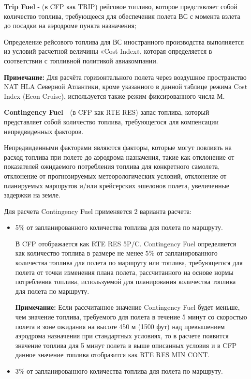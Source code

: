 \textbf{Trip Fuel} - (в CFP как TRIP) рейсовое топливо, которое представляет собой количество топлива, требующееся для обеспечения полета ВС с момента взлета до посадки на аэродроме пункта назначения;


Определение рейсового топлива для ВС иностранного производства выполняется из условий расчетной величины «Cost Index», которая определяется в соответствии с топливной политикой авиакомпании. 

\textbf{Примечание:} Для расчёта горизонтального полета через воздушное пространство NAT HLA Северной Атлантики, кроме указанного в данной таблице режима Cost Index (Econ Cruise), используется также режим фиксированного числа М.

\textbf{Contingency Fuel} - (в CFP как RTE RES) запас топлива, который представляет собой количество топлива, требующегося для компенсации непредвиденных факторов. 

Непредвиденными факторами являются факторы, которые могут повлиять на расход топлива при полете до аэродрома назначения, такие как отклонение от показателей ожидаемого потребления топлива для конкретного самолета, отклонение от прогнозируемых метеорологических условий, отклонение от планируемых маршрутов и/или крейсерских эшелонов полета, увеличенные задержки на земле.

Для расчета Contingency Fuel применяется 2 варианта расчета: 
\begin{itemize}
    \item 5\% от запланированного количества топлива для полета по маршруту.
    
    В CFP отображается как RTE RES 5P/C. Contingency Fuel определяется как количество топлива в размере не менее 5\% от запланированного количества топлива для полета по маршруту или топлива, требующегося для полета от точки изменения плана полета, рассчитанного на основе нормы потребления топлива, используемой для планирования количества топлива для полета по маршруту.

    \textbf{Примечание:} Если рассчитанное значение Contingency Fuel будет меньше, чем значение топлива, требуемого для полета в течение 5 минут со скоростью полета в зоне ожидания на высоте 450 м (1500 фут) над превышением аэродрома назначения при стандартных условиях, то в расчете появится значение топлива для 5 минут полета в выше описанных условия и в CFP данное значение топлива отобразится как RTE RES MIN CONT.

    \item 3\% от запланированного количества топлива для полета по маршруту.
\end{itemize}
 
